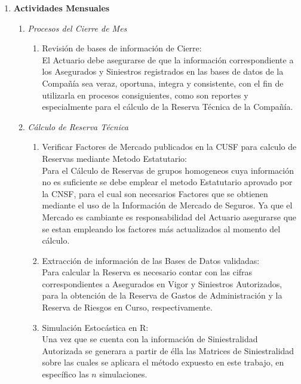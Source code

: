 \documentclass[11pt,twoside,openright,spanish]{report}
\numberwithin{equation}{chapter}
\numberwithin{figure}{chapter}
\numberwithin{table}{chapter}
\begin{document}
\begin{singlespace}
	\begin{enumerate}
		\item \textbf{Actividades Mensuales}
		\begin{enumerate}
			\item \textit{Procesos del Cierre de Mes} \begin{enumerate}
				\item Revisión de bases de información de Cierre:
				\\ \-\hspace{0.5cm} El Actuario debe asegurarse de que la información correspondiente a los Asegurados y Siniestros registrados en las bases de datos de la Compañía sea veraz, oportuna, integra y consistente, con el fin de utilizarla en procesos consiguientes, como son reportes y especialmente para el cálculo de la Reserva Técnica de la Compañía.\\
			\end{enumerate}
			\item \textit{ Cálculo de Reserva Técnica}  	\begin{enumerate}
				\item Verificar Factores de Mercado publicados en la CUSF para calculo de Reservas mediante Metodo Estatutario:\\ \-\hspace{0.5cm}
				Para el Cálculo de Reservas de grupos homogeneos cuya información no es suficiente se debe emplear el metodo Estatutario aprovado por la CNSF, para el cual son necesarios Factores que se obtienen mediante el uso de la Información de Mercado de Seguros. Ya que el Mercado es cambiante es responsabilidad del Actuario asegurarse que se estan empleando los factores más actualizados al momento del cálculo.
				\item Extracción de información de las Bases de Datos validadas:\\ \-\hspace{0.5cm}
				Para calcular la Reserva es necesario contar con las cifras correspondientes a Asegurados en Vigor y Siniestros Autorizados, para la obtención de la Reserva de Gastos de Administración y la Reserva de Riesgos en Curso, respectivamente.				
				\item Simulación Estocástica en R:\\ \-\hspace{0.5cm}
				Una vez que se cuenta con la información de Siniestralidad Autorizada se generara a partir de élla las Matrices de Siniestralidad sobre las cuales se aplicara el método expuesto en este trabajo, en específico las $n$ simulaciones.

\end{enumerate}
\end{enumerate}
\end{enumerate}
\end{singlespace}
\end{document}
